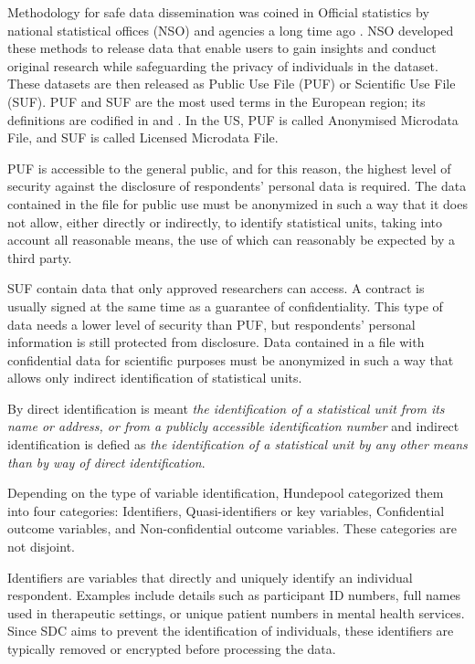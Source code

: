\documentclass{article}
\begin{document}
Methodology for safe data dissemination was coined in Official statistics by national statistical offices (NSO) and agencies a long time ago \cite{1977_Dalenius}. NSO developed these methods to release data  that enable users to gain insights and conduct original research while safeguarding the privacy of individuals in the dataset. 
These datasets are then released as Public Use File (PUF) or Scientific Use File (SUF). PUF and SUF are the most used terms in the European region; its definitions are codified in \cite{2009_EU_223/2009} and \cite{2015_EU_2015/759}. In the US, PUF is called Anonymised Microdata File, and SUF is called Licensed Microdata File. 

PUF is accessible to the general public, and for this reason, the highest level of security against the disclosure of respondents' personal data is required. The data contained in the file for public use must be anonymized in such a way that it does not allow, either directly or indirectly, to identify statistical units, taking into account all reasonable means, the use of which can reasonably be expected by a third party. 

SUF contain data that only approved researchers can access. A contract is usually signed at the same time as a guarantee of confidentiality. This type of data needs a lower level of security than PUF, but respondents' personal information is still protected from disclosure. Data contained in a file with confidential data for scientific purposes must be anonymized in such a way that allows only indirect identification of statistical units.

By direct identification \cite{2009_EU_223/2009} is meant \textit{the identification of a statistical unit from its name or address, or from a publicly accessible identification number} and indirect identification \cite{2009_EU_223/2009} is defied as  \textit{the identification of a statistical unit by any other means than by way of direct identification}.
\newline

Depending on the type of variable identification, Hundepool \cite{2012_Hundepool} categorized them into four categories: Identifiers, Quasi-identifiers or key variables, Confidential outcome variables, and Non-confidential outcome variables. These categories are not disjoint.

Identifiers are variables that directly and uniquely identify an individual respondent. Examples include details such as participant ID numbers, full names used in therapeutic settings, or unique patient numbers in mental health services. Since SDC aims to prevent the identification of individuals, these identifiers are typically removed or encrypted before processing the data.
\end{document}
